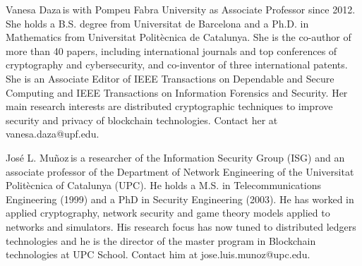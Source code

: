 \documentclass{IEEEcsmag}
\begin{document}
\begin{IEEEbiography}{Vanesa Daza}{\,}is with Pompeu Fabra University as 
Associate Professor since 2012. 
She holds a B.S. degree from Universitat de Barcelona and a Ph.D. in 
Mathematics from Universitat Politècnica de Catalunya.
She is the co-author of more than 40 papers, including international
journals and top conferences of cryptography and cybersecurity, and
co-inventor of three international patents. 
She is an Associate Editor of IEEE Transactions 
on Dependable and Secure Computing and IEEE Transactions on Information Forensics 
and Security. 
Her main research interests are distributed cryptographic 
techniques to improve security and privacy of blockchain technologies. 
Contact her at vanesa.daza@upf.edu.
\end{IEEEbiography}

\begin{IEEEbiography}{Jos\'e L. Mu\~noz}{\,}is a researcher of the Information Security Group (ISG) 
and an associate professor of the Department of Network Engineering of the Universitat Politècnica 
of Catalunya (UPC).
He holds a M.S. in Telecommunications Engineering (1999) and a PhD in Security Engineering (2003).
He has worked in applied cryptography, network security and game theory models applied to networks and simulators.
His research focus has now tuned to distributed ledgers technologies and he is the director of the master program 
in Blockchain technologies at UPC School. Contact him at jose.luis.munoz@upc.edu.
\end{IEEEbiography}
\end{document}
